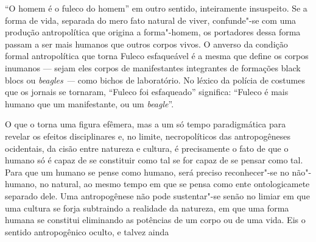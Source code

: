 ``O homem é o fuleco do homem'' em outro sentido, inteiramente
insuspeito. Se a forma de vida, separada do mero fato natural de viver,
confunde"-se com uma produção antropolítica que origina a forma"-homem, os
portadores dessa forma passam a ser mais humanos que outros corpos
vivos. O anverso da condição formal antropolítica que torna Fuleco
esfaqueável é a mesma que define os corpos inumanos --- sejam eles corpos
de manifestantes integrantes de formações black blocs ou \emph{beagles
---} como bichos de laboratório. No léxico da polícia de costumes que os
jornais se tornaram, ``Fuleco foi esfaqueado'' significa: ``Fuleco é
mais humano que um manifestante, ou um \emph{beagle}''.

O que o torna uma figura efêmera, mas a um só tempo paradigmática para
revelar os efeitos disciplinares e, no limite, necropolíticos das
antropogêneses ocidentais, da cisão entre natureza e cultura, é
precisamente o fato de que o humano só é capaz de se constituir como tal
se for capaz de se pensar como tal. Para que um humano se pense como
humano, será preciso reconhecer"-se no não"-humano, no natural, ao mesmo
tempo em que se pensa como ente ontologicamete separado dele. Uma
antropogênese não pode sustentar"-se senão no limiar em que uma cultura
se forja subtraindo a realidade da natureza, em que uma forma humana se
constitui eliminando as potências de um corpo ou de uma vida. Eis o
sentido antropogênico oculto, e talvez ainda
